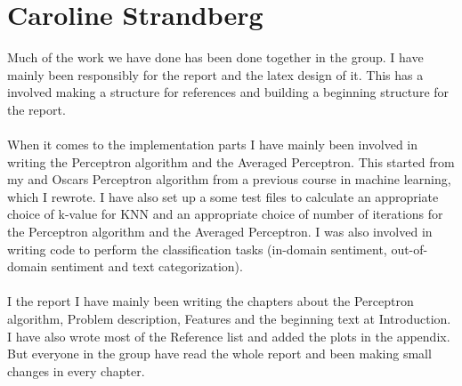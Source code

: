\newpage
\section*{Caroline Strandberg}
Much of the work we have done has been done together in the group. 
I have mainly been responsibly for the report and the latex design of it. This has a involved making a structure for references and building a beginning structure for the report.   
\\\\
When it comes to the implementation parts I have mainly been involved in writing the Perceptron algorithm and the Averaged Perceptron. This started from my and Oscars Perceptron algorithm from a previous course in machine learning, which I rewrote. I have also set up a some test files to calculate an appropriate choice of k-value for KNN and an appropriate choice of number of iterations for the Perceptron algorithm and the Averaged Perceptron. I was also involved in writing code to perform the classification tasks (in-domain sentiment, out-of-domain sentiment and text categorization).
\\\\
I the report I have mainly been writing the chapters about the Perceptron algorithm, Problem description, Features and the beginning text at Introduction. I have also wrote most of the Reference list and added the plots in the appendix. But everyone in the group have read the whole report and been making small changes in every chapter. 
